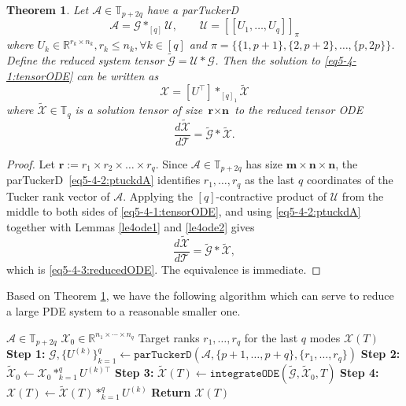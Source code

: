 \documentclass[11pt, oneside]{article}  %
\newtheorem{thm}{Theorem}[section]
\newcommand{\dsb}[1]{[\![#1]\!]}
\newcommand{\RR}{\mathbb{R}}
\newcommand{\TT}{\mathbb{T}}
\newcommand{\A}{\mathcal{A}}
\newcommand{\caG}{\mathcal{G}}
\newcommand{\tG}{\tilde{\mathcal{G}}}
\newcommand{\T}{\mathcal{T}}
\newcommand{\U}{\mathcal{U}}
\newcommand{\X}{\mathcal{X}}
\newcommand{\ttX}{\tilde{\X}}
\newcommand{\bfm}{\textbf{m}}
\newcommand{\bfn}{\textbf{n}}
\newcommand{\bfr}{\textbf{r}}
\newcommand{\beq}{\begin{equation}}
\newcommand{\eeq}{\end{equation}}
\begin{document}
\begin{thm}\label{th5-4-1:ode}
Let $\A\in\TT_{p+2q}$ have a parTuckerD
\beq\label{eq5-4-2:ptuckdA}
\A = \caG \ast_{[q]} \U, \qquad \U = \dsb{U_1,\ldots,U_q}_{\pi}
\eeq
where $U_k\in\RR^{r_k\times n_k}, r_k\le n_k, \forall k\in[q]$ and $\pi=\{\{1,p+1\},\{2,p+2\},\ldots,\{p,2p\}\}$.  Define the reduced system tensor $\tG = \U\ast\caG$.  Then the solution to \eqref{eq5-4-1:tensorODE} can be written as
\beq\label{eq5-4-3:red-sol}
\X = [U^{\top}] \ast_{[q]_{1}}\ttX
\eeq
where $\ttX\in\TT_q$ is a solution tensor of size $\bfr\times \bfn$ to the \emph{reduced} tensor ODE
\beq\label{eq5-4-3:reducedODE}
\frac{d\ttX}{d\T} = \tG \ast \ttX.
\eeq
\end{thm}

\begin{proof}
Let $\bfr:= r_1\times r_2\times \dots\times r_q$. Since $\A\in\TT_{p+2q}$ has size $\bfm\times\bfn\times\bfn$, the 
parTuckerD~\eqref{eq5-4-2:ptuckdA} identifies $r_1,\ldots,r_q$ as the last $q$ coordinates of the Tucker rank vector of $\A$.  Applying the 
$[q]$-contractive product of $\U$ from the middle to both sides of \eqref{eq5-4-1:tensorODE}, and using \eqref{eq5-4-2:ptuckdA} together with 
Lemmas \ref{le4ode1} and \ref{le4ode2} gives
\[
\frac{d\ttX}{d\T} = \tG \ast \ttX,
\]
which is \eqref{eq5-4-3:reducedODE}.  The equivalence is immediate.
\end{proof}

Based on Theorem \ref{th5-4-1:ode}, we have the following algorithm which can serve to reduce a large PDE system to a reasonable smaller one. 

\begin{algorithm}
\caption{Model Reduction for $\frac{d\X}{d\T}=\A\ast\X$ via parTuckerD}
\label{alg5-2:tucker-reduction}
\begin{algorithmic}[1]
\Require $\A\in\TT_{p+2q}$ 
\Require $\X_0\in\RR^{n_1\times\cdots\times n_q}$ 
\Require Target ranks $r_1,\ldots,r_q$ for the last $q$ modes
\Ensure $\X(T)$ 
\State \textbf{Step 1:} $\caG,\{U^{(k)}\}_{k=1}^q \gets \texttt{parTuckerD}(\A,\{p+1,\ldots,p+q\},\{r_1,\ldots,r_q\})$
\State \textbf{Step 2:} $\ttX_0 \gets \X_0 \ast_{k=1}^q U^{(k)\top}$ 
\State \textbf{Step 3:} $\ttX(T) \gets \texttt{integrateODE}(\tG,\ttX_0,T)$ 
\State \textbf{Step 4:} $\X(T) \gets \ttX(T) \ast_{k=1}^q U^{(k)}$ 
\State \textbf{Return} $\X(T)$
\end{algorithmic}
\end{algorithm}
\end{document}
